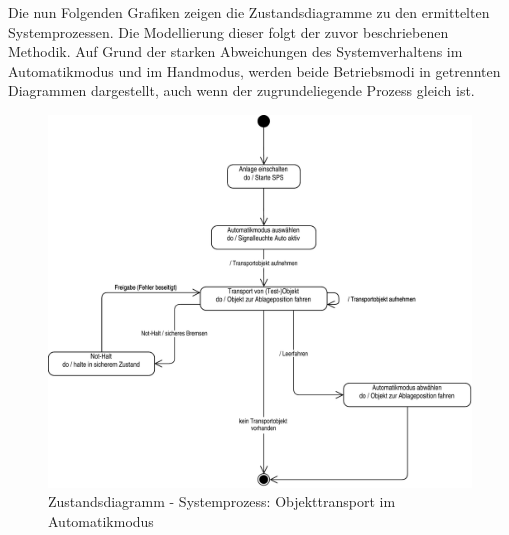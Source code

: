 \documentclass[../Bachelorarbeit.tex]{subfiles}
\begin{document}
Die nun Folgenden Grafiken zeigen die Zustandsdiagramme zu den ermittelten Systemprozessen. Die Modellierung dieser folgt der zuvor beschriebenen Methodik. Auf Grund der starken Abweichungen des Systemverhaltens im Automatikmodus und im Handmodus, werden beide Betriebsmodi in getrennten Diagrammen dargestellt, auch wenn der zugrundeliegende Prozess gleich ist. 

\begin{figure}[H]
    \centering
    \includegraphics[width=\textwidth]{Images/auto_zustand.pdf}
    \caption[Zustandsdiagramm Automatikmodus]{Zustandsdiagramm - Systemprozess: Objekttransport im Automatikmodus}
    \label{fig:my-img4}
\end{figure}
\end{document}
